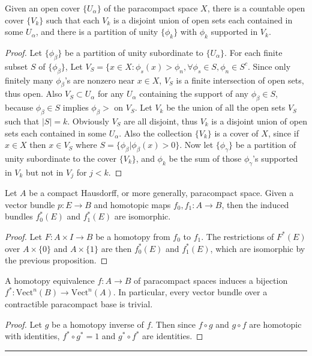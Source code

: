 \begin{lemma} Given an open cover $\{U_\alpha\}$ of the paracompact space $X$, there is a countable open cover $\{V_k\}$ such that each $V_k$ is a disjoint union of open sets each contained in some $U_\alpha$, and there is a partition of unity $\{\phi_k\}$ with $\phi_k$ supported in $V_k$.
\end{lemma}
\begin{proof}
Let $\{\phi_\beta\}$ be a partition of unity subordinate to $\{U_\alpha\}$. For each finite subset $S$ of $\{\phi_\beta\}$, Let $V_S=\{x\in X:\phi_s(x)>\phi_n,\forall \phi_s\in S, \phi_n\in S^c$. Since only finitely many $\phi_\beta$'s are nonzero near $x\in X$, $V_S$ is a finite intersection of open sets, thus open. Also $V_S\subset U_\alpha$ for any $U_\alpha$ containing the support of any $\phi_\beta\in S$, because $\phi_\beta\in S$ implies $\phi_\beta>$ on $V_S$. Let $V_k$ be the union of all the open sets $V_S$ such that $|S|=k$. Obviously $V_S$ are all disjoint, thus $V_k$ is a disjoint union of open sets each contained in some $U_\alpha$. Also the collection $\{V_k\}$ is a cover of $X$, since if $x\in X$ then $x\in V_S$ where $S=\{\phi_\beta|\phi_\beta(x)>0\}$. Now let $\{\phi_\gamma\}$ be a partition of unity subordinate to the cover $\{V_k\}$, and $\phi_k$ be the sum of those $\phi_\gamma$'s supported in $V_k$ but not in $V_j$ for $j<k$.
\end{proof}

\begin{thm} Let $A$ be a compact Hausdorff, or more generally, paracompact space. Given a vector bundle $p:E\rightarrow B$ and homotopic maps $f_0,f_1:A\rightarrow B$, then the induced bundles $f_0^*(E)$ and $f_1^*(E)$ are isomorphic.
\end{thm}
\begin{proof}
Let $F:A\times I\rightarrow B$ be a homotopy from $f_0$ to $f_1$. The restrictions of $F^*(E)$ over $A\times \{0\}$ and $A\times \{1\}$ are then $f_0^*(E)$ and $f_1^*(E)$, which are isomorphic by the previous proposition.
\end{proof}

\begin{cor} A homotopy equivalence $f:A\rightarrow B$ of paracompact spaces induces a bijection $f^*:\textrm{Vect}^n(B)\rightarrow \textrm{Vect}^n(A)$. In particular, every vector bundle over a contractible paracompact base is trivial.
\end{cor}
\begin{proof}
Let $g$ be a homotopy inverse of $f$. Then since $f\circ g$ and $g\circ f$ are homotopic with identities, $f^*\circ g^*=1$ and $g^*\circ f^*$ are identities.
\end{proof}

\noindent\rule{\textwidth}{1pt}
\newline